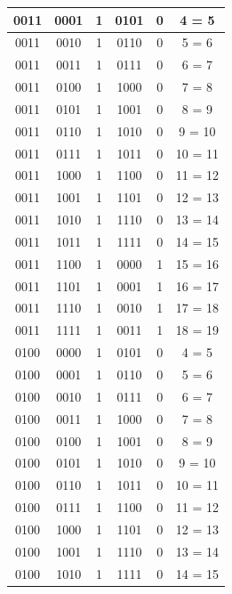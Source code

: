 \documentclass{exam}
\begin{document}
\begin{center}
\begin{longtable}{|c|c|c|c|c|c|}
                0011 & 0001 & 1 & 0101 & 0 & 4 = 5 \\ \hline
                0011 & 0010 & 1 & 0110 & 0 & 5 = 6 \\ \hline
                0011 & 0011 & 1 & 0111 & 0 & 6 = 7 \\ \hline
                0011 & 0100 & 1 & 1000 & 0 & 7 = 8 \\ \hline
                0011 & 0101 & 1 & 1001 & 0 & 8 = 9 \\ \hline
                0011 & 0110 & 1 & 1010 & 0 & 9 = 10 \\ \hline
                0011 & 0111 & 1 & 1011 & 0 & 10 = 11 \\ \hline
                0011 & 1000 & 1 & 1100 & 0 & 11 = 12 \\ \hline
                0011 & 1001 & 1 & 1101 & 0 & 12 = 13 \\ \hline
                0011 & 1010 & 1 & 1110 & 0 & 13 = 14 \\ \hline
                0011 & 1011 & 1 & 1111 & 0 & 14 = 15 \\ \hline
                0011 & 1100 & 1 & 0000 & 1 & 15 = 16 \\ \hline
                0011 & 1101 & 1 & 0001 & 1 & 16 = 17 \\ \hline
                0011 & 1110 & 1 & 0010 & 1 & 17 = 18 \\ \hline
                0011 & 1111 & 1 & 0011 & 1 & 18 = 19 \\ \hline
                0100 & 0000 & 1 & 0101 & 0 & 4 = 5 \\ \hline
                0100 & 0001 & 1 & 0110 & 0 & 5 = 6 \\ \hline
                0100 & 0010 & 1 & 0111 & 0 & 6 = 7 \\ \hline
                0100 & 0011 & 1 & 1000 & 0 & 7 = 8 \\ \hline
                0100 & 0100 & 1 & 1001 & 0 & 8 = 9 \\ \hline
                0100 & 0101 & 1 & 1010 & 0 & 9 = 10 \\ \hline
                0100 & 0110 & 1 & 1011 & 0 & 10 = 11 \\ \hline
                0100 & 0111 & 1 & 1100 & 0 & 11 = 12 \\ \hline
                0100 & 1000 & 1 & 1101 & 0 & 12 = 13 \\ \hline
                0100 & 1001 & 1 & 1110 & 0 & 13 = 14 \\ \hline
                0100 & 1010 & 1 & 1111 & 0 & 14 = 15 \\ \hline

\end{longtable}
\end{center}
\end{document}
